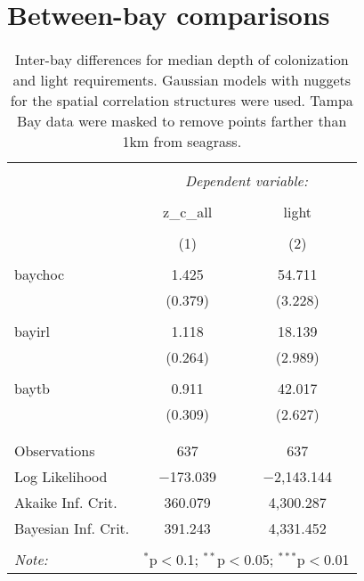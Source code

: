 \documentclass[letterpaper,12pt]{article}\usepackage[]{graphicx}\usepackage[]{color}
\begin{document}
\section{Between-bay comparisons}    




\begin{table}[!htbp] \centering 
  \caption{Inter-bay differences for median depth of colonization and light requirements.  Gaussian models with nuggets for the spatial correlation structures were used.  Tampa Bay data were masked to remove points farther than 1km from seagrass.} 
  \label{} 
\begin{tabular}{@{\extracolsep{5pt}}lcc} 
\\[-1.8ex]\hline 
\hline \\[-1.8ex] 
 & \multicolumn{2}{c}{\textit{Dependent variable:}} \\ 
\cline{2-3} 
\\[-1.8ex] & z\_c\_all & light \\ 
\\[-1.8ex] & (1) & (2)\\ 
\hline \\[-1.8ex] 
 baychoc & 1.425 & 54.711 \\ 
  & (0.379) & (3.228) \\ 
  & & \\ 
 bayirl & 1.118 & 18.139 \\ 
  & (0.264) & (2.989) \\ 
  & & \\ 
 baytb & 0.911 & 42.017 \\ 
  & (0.309) & (2.627) \\ 
  & & \\ 
\hline \\[-1.8ex] 
Observations & 637 & 637 \\ 
Log Likelihood & $-$173.039 & $-$2,143.144 \\ 
Akaike Inf. Crit. & 360.079 & 4,300.287 \\ 
Bayesian Inf. Crit. & 391.243 & 4,331.452 \\ 
\hline 
\hline \\[-1.8ex] 
\textit{Note:}  & \multicolumn{2}{r}{$^{*}$p$<$0.1; $^{**}$p$<$0.05; $^{***}$p$<$0.01} \\ 
\end{tabular} 
\end{table} 
\end{document}
